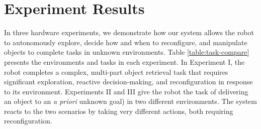 \documentclass[journal]{IEEEtran}
\begin{document}




\section{Experiment Results}
\label{sec:experiments}
%

In three hardware experiments, we demonstrate how our system allows the robot to autonomously explore, decide how and when to reconfigure, and manipulate objects to complete tasks in unknown environments. Table \ref{table:task-compare} presents the environments and tasks in each experiment.
In Experiment I, the robot completes a complex, multi-part object retrieval task that requires significant exploration, reactive decision-making, and reconfiguration in response to its environment.
Experiments II and III give the robot the task of delivering an object to an \textit{a priori} unknown goal) in two different environments.  The system reacts to the two scenarios by taking very different actions, both requiring reconfiguration.
\end{document}
